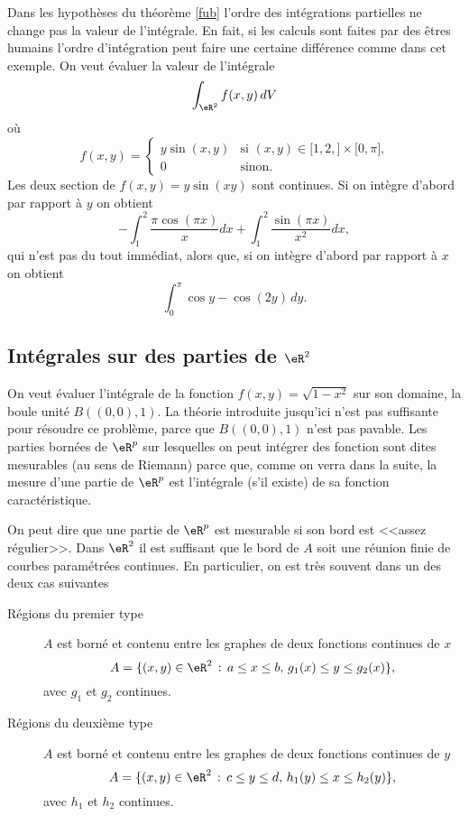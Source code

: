 \begin{example}
  Dans les hypothèses du théorème \ref{fub}  l'ordre des intégrations partielles ne change pas la valeur de l'intégrale. En fait, si les calculs sont faites par des êtres humains l'ordre d'intégration peut faire une certaine différence comme dans cet exemple. On veut évaluer la valeur de l'intégrale 
\[
\int_{\eR^2}f(x,y)\, dV
\]
où 
\begin{equation}
	f(x,y)=\begin{cases}
		y\sin(x,y)	&	\text{si $(x,y)\in\mathopen[ 1,2 ,  \mathclose]\times\mathopen[ 0 , \pi \mathclose]$,}\\
		0	&	 \text{sinon.}
	\end{cases}
\end{equation}
Les deux section de $f(x,y)=y\sin(xy)$ sont continues. Si on intègre d'abord par rapport à $y$ on obtient 
\[
-\int_1^2\frac{ \pi\cos(\pi x) }{ x }dx+\int_1^2\frac{ \sin(\pi x) }{ x^2 }dx,
\] 
qui n'est pas du tout immédiat, alors que, si on intègre d'abord par rapport à $x$ on obtient 
\[
\int_0^\pi \cos y - \cos(2y)\,dy.
\] 
\end{example}

\subsection{Intégrales sur des parties de $\eR^2$ }

On veut évaluer l'intégrale de la fonction $f(x,y)=\sqrt{1-x^2}$ sur son domaine, la boule unité $B((0,0),1)$. La théorie introduite jusqu'ici n'est pas suffisante pour résoudre  ce problème, parce que $B((0,0),1)$ n'est pas pavable. Les parties bornées de $\eR^p$ sur lesquelles on peut intégrer des fonction sont dites mesurables (au sens de Riemann) parce que, comme on verra dans la suite, la mesure d'une partie de $\eR^p$ est l'intégrale (s'il existe) de sa fonction caractéristique. 

On peut dire que une partie de $\eR^p$  est mesurable si son bord est <<assez régulier>>. Dans $\eR^2$ il est suffisant que le bord de $A$ soit une réunion finie de courbes paramétrées continues. En particulier, on est très souvent dans un des deux cas suivantes
\begin{description}
\item[Régions du premier type] $A$ est borné et contenu entre les graphes de deux fonctions continues de $x$
\[
A=\{(x,y)\in\eR^2 \,:\, a\leq x\leq b, \, g_1(x)\leq y\leq g_2(x)\}, 
\]
avec $g_1$ et $g_2$ continues. 
\item[Régions du deuxième type] $A$ est borné et contenu entre les graphes de deux fonctions continues de $y$
\[
A=\{(x,y)\in\eR^2 \,:\, c\leq y\leq d, \, h_1(y)\leq x\leq h_2(y)\}, 
\]
avec $h_1$ et $h_2$ continues.
\end{description}
\newcommand{\CaptionFigRegioniPrimoeSecondoTipo}{Régions du premier et du deuxième type}


